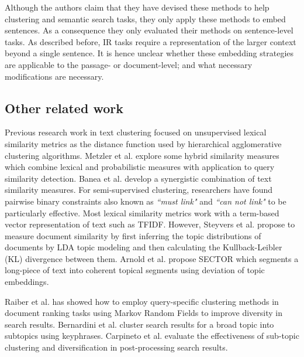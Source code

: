 Although the authors claim that they have devised these methods to help clustering and semantic search tasks, they only apply these methods to embed sentences. As a consequence they  only evaluated their methods on sentence-level tasks. As described before, IR tasks require a representation of the larger context beyond a single sentence. It is hence unclear whether these embedding strategies are applicable to the passage- or document-level;  and what necessary modifications are necessary.

\subsection{Other related work} Previous research work in text clustering\cite{kulis2009semi,bilenko2004integrating,davidson2008finding,basu2004probabilistic,basu2002semi,gomaa2013survey} focused on unsupervised lexical similarity metrics as the distance function used by hierarchical agglomerative clustering algorithms. Metzler et al.\cite{metzler2007similarity} explore some hybrid similarity measures which combine lexical and probabilistic measures with application to query similarity detection. Banea et al.\cite{banea2012unt} develop a synergistic combination of text similarity measures. For semi-supervised clustering, researchers have found pairwise binary constraints also known as \textit{``must link"} and \textit{``can not link"} to be particularly effective. Most lexical similarity metrics work with a term-based vector representation of text such as TFIDF. However, Steyvers et al.\cite{steyvers2007probabilistic} propose to measure document similarity by first inferring the topic distributions of documents by LDA\cite{blei2003latent} topic modeling and then calculating the Kullback-Leibler (KL) divergence between them. Arnold et al. propose SECTOR \cite{arnold2019sector} which segments a long-piece of text into coherent topical segments using deviation of topic embeddings.

Raiber et al. \cite{raiber2013ranking} has showed how to employ query-specific clustering methods in document ranking tasks using Markov Random Fields to improve diversity in search results. Bernardini et al. \cite{bernardini2009full} cluster search results for a broad topic into subtopics using keyphrases. Carpineto et al. \cite{carpineto2012evaluating} evaluate the effectiveness of sub-topic clustering and diversification in post-processing search results.

